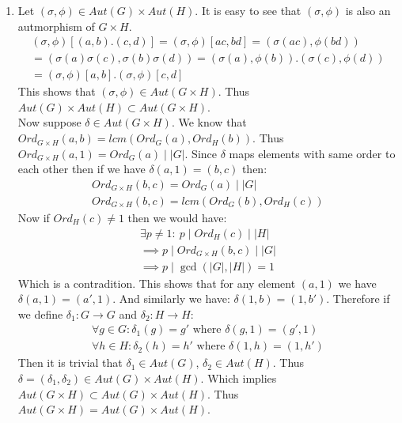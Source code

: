 \begin{enumerate}[label=]
    \item 
        Let $(\sigma, \phi) \in Aut(G) \times Aut(H)$. It is easy to see that $(\sigma, \phi)$ is also an autmorphism of $G \times H$. 
        \begin{gather*}
            (\sigma, \phi)[(a, b).(c, d)] = (\sigma, \phi)[ac, bd] = (\sigma(ac), \phi(bd)) \\
            = (\sigma(a) \sigma(c), \sigma(b) \sigma(d)) = (\sigma(a), \phi(b)).(\sigma(c), \phi(d)) \\
            = (\sigma, \phi)[a, b]. (\sigma, \phi)[c, d]
        \end{gather*}
        This shows that $(\sigma, \phi) \in Aut(G \times H)$. Thus $Aut(G) \times Aut(H) \subset Aut(G \times H)$. \\
        Now suppose $\delta \in Aut(G \times H)$. We know that $Ord_{G \times H}(a, b) = lcm(Ord_G(a), Ord_H(b))$. Thus $Ord_{G \times H}(a, 1) = Ord_G(a) \mid |G|$.
        Since $\delta$ maps elements with same order to each other then if we have $\delta(a, 1) = (b, c)$ then:
        \begin{gather*}
            Ord_{G \times H}(b, c) = Ord_G(a) \mid |G| \\
            Ord_{G \times H}(b, c) = lcm(Ord_G(b), Ord_H(c))
        \end{gather*}
        Now if $Ord_H(c) \ne 1$ then we would have:
        \begin{gather*}
            \exists p \ne 1: \ p \mid Ord_H(c) \mid |H| \\
            \implies p \mid Ord_{G \times H}(b, c) \mid |G| \\
            \implies p \mid \gcd(|G|, |H|) = 1
        \end{gather*}
        Which is a contradition. This shows that for any element $(a, 1)$ we have $\delta(a, 1) = (a', 1)$. And similarly we have: $\delta(1, b) = (1, b')$. Therefore if we define $\delta_1: G \to G$ and $\delta_2: H \to H$:
        \begin{gather*}
            \forall g \in G: \delta_1(g) = g' \text{ where } \delta(g, 1) = (g', 1) \\
            \forall h \in H: \delta_2(h) = h' \text{ where } \delta(1, h) = (1, h')
        \end{gather*}
        Then it is trivial that $\delta_1 \in Aut(G)$, $\delta_2 \in Aut(H)$. Thus \(\delta = (\delta_1, \delta_2) \in Aut(G) \times Aut(H)\). Which implies $Aut(G \times H) \subset Aut(G) \times Aut(H)$. Thus $Aut(G \times H) = Aut(G) \times Aut(H)$.
\end{enumerate}